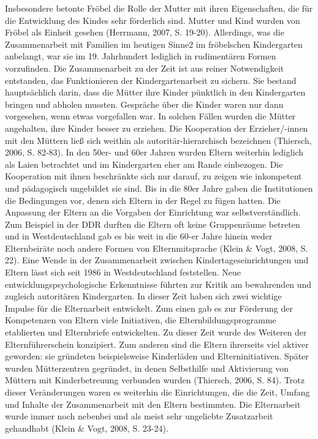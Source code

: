 \documentclass[12pt,a4paper]{article}
\begin{document}
Insbesondere betonte Fröbel die Rolle der Mutter mit ihren Eigenschaften, die für die Entwicklung des Kindes sehr förderlich sind. Mutter und Kind wurden von Fröbel als Einheit gesehen (Herrmann, 2007, S. 19-20). Allerdings, was die Zusammenarbeit mit Familien im heutigen Sinne2 im fröbelschen Kindergarten  anbelangt, war sie im 19. Jahrhundert lediglich in rudimentären Formen vorzufinden. Die Zusammenarbeit zu der Zeit ist aus reiner Notwendigkeit entstanden, das Funktionieren der Kindergartenarbeit zu sichern. Sie bestand hauptsächlich darin,  dass die Mütter ihre Kinder pünktlich in den Kindergarten bringen und abholen mussten. Gespräche über die Kinder waren nur dann vorgesehen, wenn etwas vorgefallen war. In solchen Fällen wurden die Mütter angehalten, ihre Kinder besser zu erziehen. Die Kooperation der Erzieher/-innen mit den Müttern ließ sich weithin als autoritär-hierarchisch bezeichnen (Thiersch, 2006, S. 82-83).
	In den 50er- und 60er Jahren wurden Eltern weiterhin lediglich als Laien betrachtet und im Kindergarten eher am Rande einbezogen. Die Kooperation mit ihnen beschränkte sich nur darauf, zu zeigen wie inkompetent und pädagogisch ungebildet sie sind. Bis in die 80er Jahre gaben die Institutionen die Bedingungen vor, denen sich Eltern in der Regel zu fügen hatten. Die Anpassung der Eltern an die Vorgaben der Einrichtung war selbstverständlich. Zum Beispiel in der DDR durften die Eltern oft keine Gruppenräume betreten und in Westdeutschland gab es bis weit in die 60-er Jahre hinein weder Elternbeiräte noch andere Formen von Elternmitsprache (Klein \& Vogt, 2008, S. 22).
	Eine Wende in der Zusammenarbeit zwischen Kindertageseinrichtungen und Eltern lässt sich seit 1986 in Westdeutschland feststellen. Neue entwicklungspsychologische Erkenntnisse führten zur Kritik am bewahrenden und zugleich autoritären Kindergarten. In dieser Zeit haben sich zwei wichtige Impulse für die Elternarbeit entwickelt. Zum einen gab es zur Förderung der Kompetenzen von Eltern viele Initiativen, die Elternbildungsprogramme etablierten und Elternbriefe entwickelten. Zu dieser Zeit wurde des Weiteren der Elternführerschein konzipiert. Zum anderen sind die Eltern ihrerseits viel aktiver geworden: sie gründeten beispielsweise Kinderläden und Elterninitiativen. Später wurden Mütterzentren gegründet, in denen Selbsthilfe und Aktivierung von Müttern mit Kinderbetreuung verbunden wurden (Thiersch, 2006, S. 84). Trotz dieser Veränderungen waren es weiterhin die Einrichtungen, die die Zeit, Umfang und Inhalte der Zusammenarbeit mit den Eltern bestimmten. Die Elternarbeit wurde immer noch nebenbei und als meist sehr ungeliebte Zusatzarbeit gehandhabt (Klein \& Vogt, 2008, S. 23-24).
\end{document}
